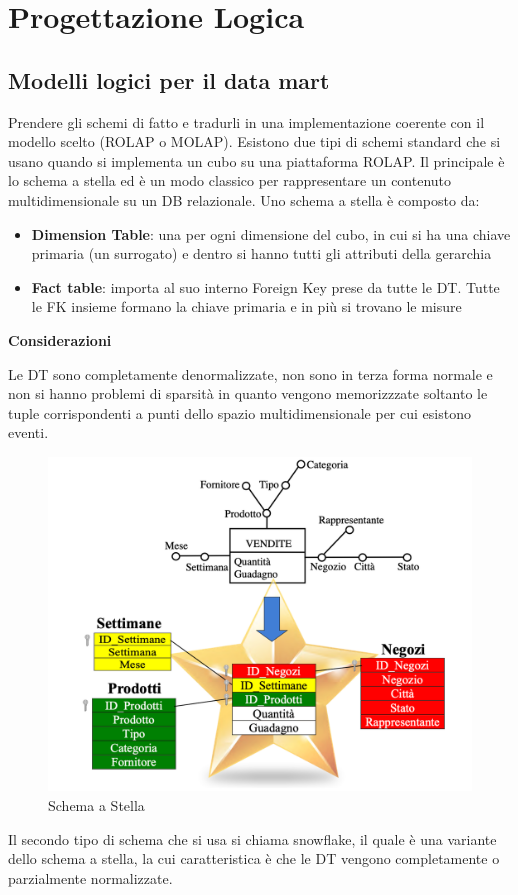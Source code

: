 \section{Progettazione Logica}

\subsection{Modelli logici per il data mart}
Prendere gli schemi di fatto e tradurli in una implementazione coerente con il modello scelto (ROLAP o MOLAP). Esistono due tipi di schemi standard che si usano quando si implementa un cubo su una piattaforma ROLAP. Il principale è lo schema a stella ed è un modo classico per rappresentare un contenuto multidimensionale su un DB relazionale. Uno schema a stella è composto da:
\begin{itemize}
	\item 
	\textbf{Dimension Table}: una per ogni dimensione del cubo, in cui si ha una chiave primaria (un surrogato) e dentro si hanno tutti gli attributi della gerarchia
	\item
	\textbf{Fact table}: importa al suo interno Foreign Key prese da tutte le DT. Tutte le FK insieme formano la chiave primaria e in più si trovano le misure
\end{itemize}

\textbf{Considerazioni}

Le DT sono completamente denormalizzate, non sono in terza forma normale e non si hanno problemi di sparsità in quanto vengono memorizzzate soltanto le tuple corrispondenti a punti dello spazio multidimensionale per cui esistono eventi. 
\begin{figure}[H]
	\centering
	\includegraphics[width=0.6\linewidth]{img/stella}
	\caption{Schema a Stella}
	\label{fig:stella}
\end{figure}
Il secondo tipo di schema che si usa si chiama snowflake, il quale è una variante dello schema a stella, la cui caratteristica è che le DT vengono completamente o parzialmente normalizzate. 

